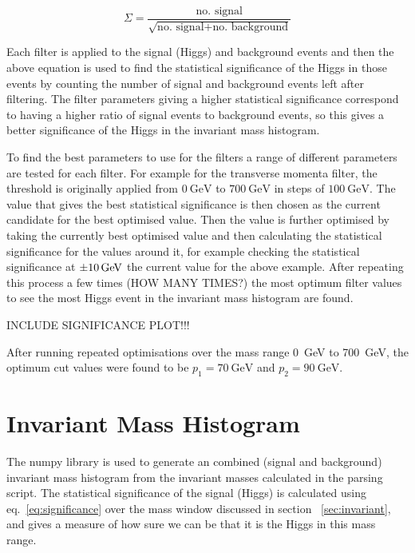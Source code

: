 \documentclass[11pt]{amsart}
\begin{document}
\begin{multicols}{2}
\begin{equation}
  \label{eq:significance}
  \Sigma = \frac{\text{no. signal}}{\sqrt{\text{no. signal} + \text{no. background}}}
\end{equation}

Each filter is applied to the signal (Higgs) and background events and then the above equation is used to find the statistical significance of the Higgs in those events by counting the number of signal and background events left after filtering. The filter parameters giving a higher statistical significance correspond to having a higher ratio of signal events to background events, so this gives a better significance of the Higgs in the invariant mass histogram.

To find the best parameters to use for the filters a range of different parameters are tested for each filter. For example for the transverse momenta filter, the threshold is originally applied from $\SI{0}{\giga\electronvolt}$ to $\SI{700}{\giga\electronvolt}$ in steps of $\SI{100}{\giga\electronvolt}$. The value that gives the best statistical significance is then chosen as the current candidate for the best optimised value. Then the value is further optimised by taking the currently best optimised value and then calculating the statistical significance for the values around it, for example checking the statistical significance at $\SI{\pm10}{\giga\electronvolt}$ the current value for the above example. After repeating this process a few times (HOW MANY TIMES?) the most optimum filter values to see the most Higgs event in the invariant mass histogram are found.

INCLUDE SIGNIFICANCE PLOT!!!

After running repeated optimisations over the mass range \SI{0}{\giga\electronvolt} to \SI{700}{\giga\electronvolt}, the optimum cut values were found to be $p_1 = \SI{70}{\giga\electronvolt}$ and $p_2 = \SI{90}{\giga\electronvolt}$.

\section{Invariant Mass Histogram}

The numpy library is used to generate an combined (signal and background) invariant mass histogram from the invariant masses calculated in the parsing script. The statistical significance of the signal (Higgs) is calculated using eq.~\ref{eq:significance} over the mass window discussed in section ~\ref{sec:invariant}, and gives a measure of how sure we can be that it is the Higgs in this mass range.


\end{multicols}
\end{document}
